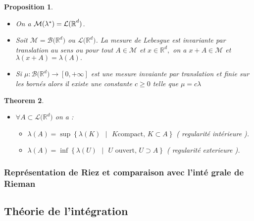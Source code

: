 \documentclass[3pt]{article}
\newtheorem{theorem}{Theorem}
\newtheorem{proposition}[theorem]{Proposition}
\begin{document}
\bigskip

\begin{proposition}
\begin{itemize}
\item On a $\mathcal{M(}\lambda ^{\ast })=\mathcal{L(\mathbb{R}}^{d}\mathcal{%
)}$.

\item Soit $\mathcal{M=\mathcal{B(}}\mathbb{R}^{d}\mathcal{\mathcal{)}}$ ou $%
\mathcal{L(}\mathbb{R}^{d}\mathcal{)}$. La mesure de Lebesgue est invariante
par translation au sens ou pour tout $A\in \mathcal{M}$ et $x\in \mathbb{R}%
^{d},$ on a $x+A\in \mathcal{M}$ et $\lambda (x+A)=\lambda (A).$

\item Si $\mu :\mathcal{\mathcal{B(}}\mathbb{R}^{d}\mathcal{\mathcal{)}%
\rightarrow }\left[ 0,+\infty \right] $ est une mesure invaiante par
translation et finie sur les born\'{e}s alors il existe une constante $c\geq
0$ telle que $\mu =c\lambda $
\end{itemize}
\end{proposition}

\begin{theorem}
\begin{itemize}
\item $\forall A\subset \mathcal{L(}\mathbb{R}^{d}\mathcal{)}$ on a : 
\newline

\begin{itemize}
\item $\lambda (A)=\sup \left\{ \lambda (K)\text{ }|\text{\ }K\text{
compact, }K\subset A\right\} $ ( regularit\'{e} int\'{e}rieure ).

\item $\lambda (A)=\inf \left\{ \lambda (U)\text{ }|\text{\ }U\text{ ouvert, 
}U\supset A\right\} $ ( regularit\'{e} exterieure ).
\end{itemize}
\end{itemize}
\end{theorem}

\bigskip

\subsubsection{Repr\'{e}sentation de Riez et comparaison avec l'int\'{e}%
grale de Rieman}

\bigskip

\subsection{Th\'{e}orie de l'int\'{e}gration}
\end{document}
